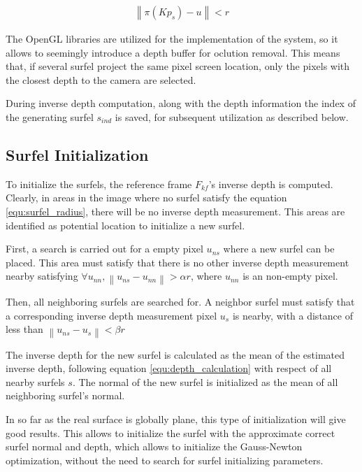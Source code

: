 \documentclass[1p]{elsarticle}
\begin{document}
\begin{align}
	\left \| \pi(K p_{s}) - u \right \| < r
	\label{equ:surfel_radius}
\end{align}

The OpenGL libraries are utilized for the implementation of the system, so it allows to seemingly introduce a depth buffer for oclution removal. This means that, if several surfel project the same pixel screen location, only the pixels with the closest depth to the camera are selected.

During inverse depth computation, along with the depth information the index of the generating surfel $s_{ind}$ is saved, for subsequent utilization as described below.

\subsection{Surfel Initialization}
\label{sec:surfel_initialization}

To initialize the surfels, the reference frame $F_{kf}$'s inverse depth is computed. Clearly, in areas in the image where no surfel satisfy the equation \ref{equ:surfel_radius}, there will be no inverse depth measurement. This areas are identified as potential location to initialize a new surfel. 

First, a search is carried out for a empty pixel $u_{ns}$ where a new surfel can be placed. This area must satisfy that there is no other inverse depth measurement nearby satisfying $\forall u_{nn}, \left \| u_{ns} - u_{nn} \right \| > \alpha r$, where $u_{nn}$ is an non-empty pixel.

Then, all neighboring surfels are searched for. A neighbor surfel must satisfy that a corresponding inverse depth measurement pixel $u_{s}$ is nearby, with a distance of less than
$\left \| u_{ns} - u_{s} \right \| < \beta r$

The inverse depth for the new surfel is calculated as the mean of the estimated inverse depth, following equation \ref{equ:depth_calculation} with respect of all nearby surfels $s$. The normal of the new surfel is initialized as the mean of all neighboring surfel's normal.

In so far as the real surface is globally plane, this type of initialization will give good results.
This allows to initialize the surfel with the approximate correct surfel normal and depth, which allows to initialize the Gauss-Newton optimization, without the need to search for surfel initializing parameters.
\end{document}

